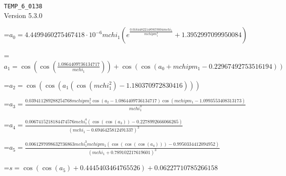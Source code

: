 \documentclass{article}
\newcommand{\exprline}[1]{\par\noindent\begingroup\setbox0=\hbox{$\displaystyle #1$}\ifdim\wd0>\linewidth\resizebox{\linewidth}{!}{\box0}\else\box0\fi\endgroup\par\medskip}
\begin{document}
\noindent\texttt{TEMP\_6\_0138}\\
Version 5.3.0\\
\exprline{a_{0} = 4.4499460275467418 \cdot 10^{-6} mchi_{1} \left(e^{\frac{0.016448221487657004 mchi_{1}}{mchipm_{1}^{3}}} + 1.3952997099950084\right)}
\exprline{a_{1} = \cos{\left(\cos{\left(\frac{1.0864409736134717}{mchi_{1}} \right)} \right)} + \cos{\left(\cos{\left(a_{0} + mchipm_{1} - 0.22967492753516194 \right)} \right)}}
\exprline{a_{2} = \cos{\left(\cos{\left(a_{1} \left(\cos{\left(mchi_{1}^{2} \right)} - 1.180370972830416\right) \right)} \right)}}
\exprline{a_{3} = \frac{0.039411289288254768 mchipm_{1}^{2} \cos{\left(a_{2} - 1.0864409736134717 \right)} \cos{\left(mchipm_{1} - 1.0993553408313173 \right)}}{mchi_{1}^{3}}}
\exprline{a_{4} = \frac{0.0067415218184474576 mchi_{1}^{4} \left(\cos{\left(\cos{\left(a_{3} \right)} \right)} - 0.2278992666066265\right)}{\left(mchi_{1} - 0.6946425812491337\right)^{3}}}
\exprline{a_{5} = \frac{0.0061297098632736863 mchi_{1}^{3} mchipm_{1} \left(\cos{\left(\cos{\left(\cos{\left(a_{4} \right)} \right)} \right)} - 0.9950334412094952\right)}{\left(mchi_{1} + 0.789102217619601\right)^{3}}}
\exprline{s = \cos{\left(\cos{\left(a_{5} \right)} + 0.4445403464765526 \right)} + 0.06227710785266158}
\end{document}
